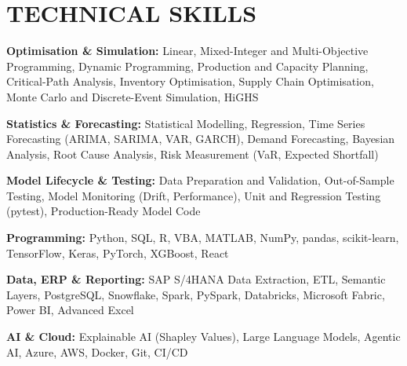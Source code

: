 \documentclass[letterpaper,11pt]{article}
\begin{document}
\section{TECHNICAL SKILLS}
\vspace{4pt}
 \begin{itemize}[leftmargin=0in, label={}]
    \small{\item{
     \textbf{\small{Optimisation \& Simulation:}}{ \small{Linear, Mixed-Integer and Multi-Objective Programming, Dynamic Programming, Production and Capacity Planning, Critical-Path Analysis, Inventory Optimisation, Supply Chain Optimisation, Monte Carlo and Discrete-Event Simulation, HiGHS}} \\
      \vspace{1.2pt}

     \textbf{\small{Statistics \& Forecasting:}}{ \small{Statistical Modelling, Regression, Time Series Forecasting (ARIMA, SARIMA, VAR, GARCH), Demand Forecasting, Bayesian Analysis, Root Cause Analysis, Risk Measurement (VaR, Expected Shortfall)}} \\
      \vspace{1.2pt}

     \textbf{\small{Model Lifecycle \& Testing:}}{ \small{Data Preparation and Validation, Out-of-Sample Testing, Model Monitoring (Drift, Performance), Unit and Regression Testing (pytest), Production-Ready Model Code}} \\
      \vspace{1.2pt}

     \textbf{\small{Programming:}}{ \small{Python, SQL, R, VBA, MATLAB, NumPy, pandas, scikit-learn, TensorFlow, Keras, PyTorch, XGBoost, React}} \\
      \vspace{1.2pt}

     \textbf{\small{Data, ERP \& Reporting:}}{ \small{SAP S/4HANA Data Extraction, ETL, Semantic Layers, PostgreSQL, Snowflake, Spark, PySpark, Databricks, Microsoft Fabric, Power BI, Advanced Excel}} \\
      \vspace{1.2pt}

     \textbf{\small{AI \& Cloud:}}{ \small{Explainable AI (Shapley Values), Large Language Models, Agentic AI, Azure, AWS, Docker, Git, CI/CD}}

     }}
 \end{itemize}
 \vspace{-10pt}
\end{document}
